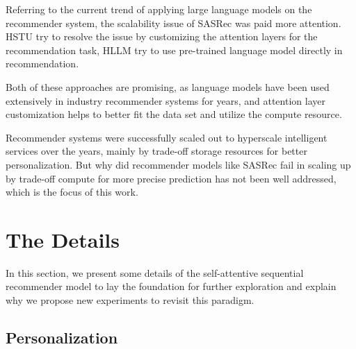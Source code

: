 \documentclass{article}
\begin{document}
Referring to the current trend of applying large language models on the recommender system, the scalability issue of SASRec was paid more attention. HSTU\cite{hstu} try to resolve the issue by customizing the attention layers for the recommendation task, HLLM\cite{hllm} try to use pre-trained language model directly in recommendation.

Both of these approaches are promising, as language models have been used extensively in industry recommender systems for years, and attention layer customization helps to better fit the data set and utilize the compute resource.

Recommender systems were successfully scaled out to hyperscale intelligent services over the years, mainly by trade-off storage resources for better personalization.
But why did recommender models like SASRec fail in scaling up by trade-off compute for more precise prediction has not been well addressed, which is the focus of this work. 





\section{The Details}

In this section, we present some details of the self-attentive sequential recommender model to lay the foundation for further exploration and explain why we propose new experiments to revisit this paradigm.



\subsection{Personalization}
\end{document}
